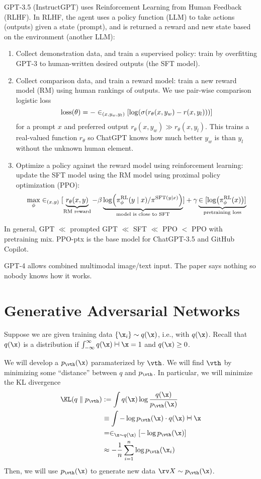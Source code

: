 \documentclass[class=cs480,notes,tikz]{agony}
\begin{document}
GPT-3.5 (InstructGPT) uses Reinforcement Learning from Human Feedback (RLHF).
In RLHF, the agent uses a policy function (LLM)
to take actions (outputs) given a state (prompt),
and is returned a reward and new state based on the environment (another LLM):
\begin{enumerate}
  \item Collect demonstration data, and train a supervised policy:
        train by overfitting GPT-3 to human-written desired outputs
        (the SFT model).
  \item Collect comparison data, and train a reward model:
        train a new reward model (RM) using human rankings of outputs.
        We use pair-wise comparison logistic loss
        \[ \operatorname{loss}(\theta) = -\in_{(x,y_w,y_l)}[\log(\sigma(r_\theta(x,y_w) - r(x,y_l)))] \]
        for a prompt $x$ and preferred output $r_\theta(x,y_w) \gg r_\theta(x,y_l)$.
        This trains a real-valued function $r_\theta$ so ChatGPT knows
        how much better $y_w$ is than $y_l$ without the unknown human element.
  \item Optimize a policy against the reward model using reinforcement learning:
        update the SFT model using the RM model using proximal policy optimization (PPO):
        \[
          \max_\phi \in_{(x,y)} [
          \underbrace{r_\theta(x,y)}_{\text{RM reward}}
          - \beta\underbrace{\log(\pi_\phi^{\text{RL}}(y \mid x) / \pi^{\text{SFT}(y \mid x)})}_{\text{model is close to SFT}}
          ] + \gamma\underbrace{\in[\log(\pi_\phi^{\text{RL}}(x))]}_{\text{pretraining loss}}
        \]
\end{enumerate}
In general, GPT $\ll$ prompted GPT $\ll$ SFT $\ll$ PPO $<$ PPO with pretraining mix.
PPO-ptx is the base model for ChatGPT-3.5 and GitHub Copilot.

GPT-4 allows combined multimodal image/text input.
The paper says nothing so nobody knows how it works.

\section{Generative Adversarial Networks}


Suppose we are given training data $\{\x_i\} \sim q(\x)$, i.e.,
with  $q(\x)$.
Recall that $q(\x)$ is a distribution if $\int_{-\infty}^\infty q(\x) \dd{\x} = 1$
and $q(\x) \geq 0$.

We will develop a  $p_{\vth}(\x)$
paramaterized by $\vth$.
We will find $\vth$ by minimizing some ``distance'' between $q$ and $p_{\vth}$.
In particular, we will minimize the KL divergence
\begin{align*}
  \KL(q \parallel p_{\vth})
   & := \int q(\x)\log\frac{q(\x)}{p_{\vth}(\x)}        \\
   & \equiv \int -\log p_{\vth}(\x) \cdot q(\x) \dd{\x} \\
   & = \E_{\x \sim q(\x)}[-\log p_{\vth}(\x)]           \\
   & \approx -\frac1n \sum_{i=1}^n\log p_{\vth}(\x_i)
\end{align*}
Then, we will use $p_{\vth}(\x)$ to generate new data $\rv X \sim p_{\vth}(\x)$.
\end{document}
